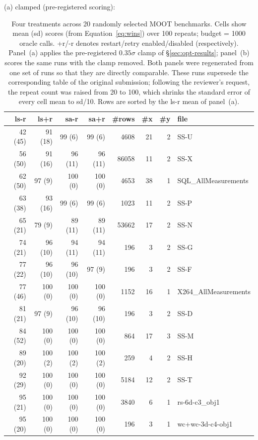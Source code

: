 \documentclass[AMA,STIX2COL]{WileyNJDv5}
\newcommand{\NEW}[1]{\textcolor{newblue}{#1}}
\begin{document}
\begin{table}[t]
\centering\tiny
\caption{Four treatments across 20 randomly selected MOOT benchmarks. Cells show
mean (sd) scores (from Equation~\ref{eq:wins}) over \NEW{100 repeats}; budget = 1000 oracle calls. +r/-r denotes restart/retry enabled/disabled (respectively).
Panel~(a) applies the pre-registered $0.35\sigma$ clamp of
\S\ref{sec:opt-results}; panel~(b) scores the same runs with the
clamp removed. Both panels were regenerated from one set of runs
so that they are directly comparable. \NEW{These runs supersede the corresponding table of the
original submission; following the reviewer's request, the
repeat count was raised from 20 to 100, which shrinks the
standard error of every cell mean to sd/10.} Rows are sorted by the
\textsf{ls-r} mean of panel~(a).}
\label{tab:opt}
%
(a) clamped (pre-registered scoring):\\[2pt]
\begin{tabular}{rrrrrrrl}
ls-r & ls+r & sa-r & sa+r & \#rows & \#x & \#y & file \\
\midrule
 42 (45) & 91 (18) & 99 (6) & 99 (6) & 4608 & 21 & 2 & SS-U \\
 56 (50) & 91 (16) & 96 (11) & 96 (11) & 86058 & 11 & 2 & SS-X \\
 62 (50) & 97 (9) & 100 (0) & 100 (0) & 4653 & 38 & 1 & SQL\_AllMeasurements \\
 63 (38) & 93 (16) & 99 (6) & 99 (6) & 1023 & 11 & 2 & SS-P \\
 65 (21) & 79 (9) & 89 (11) & 89 (11) & 53662 & 17 & 2 & SS-N \\
 74 (21) & 96 (10) & 94 (11) & 94 (11) & 196 & 3 & 2 & SS-G \\
 77 (22) & 96 (10) & 96 (10) & 97 (9) & 196 & 3 & 2 & SS-F \\
 77 (46) & 100 (0) & 100 (0) & 100 (0) & 1152 & 16 & 1 & X264\_AllMeasurements \\
 81 (21) & 97 (9) & 96 (10) & 96 (10) & 196 & 3 & 2 & SS-D \\
 84 (52) & 100 (0) & 100 (0) & 100 (0) & 864 & 17 & 3 & SS-M \\
 89 (20) & 100 (2) & 100 (2) & 100 (2) & 259 & 4 & 2 & SS-H \\
 92 (29) & 100 (0) & 100 (0) & 100 (0) & 5184 & 12 & 2 & SS-T \\
 95 (21) & 100 (0) & 100 (0) & 100 (0) & 3840 & 6 & 1 & rs-6d-c3\_obj1 \\
 95 (20) & 100 (0) & 100 (0) & 100 (0) & 196 & 3 & 1 & wc+wc-3d-c4-obj1 \\

\end{tabular}
\end{table}
\end{document}
